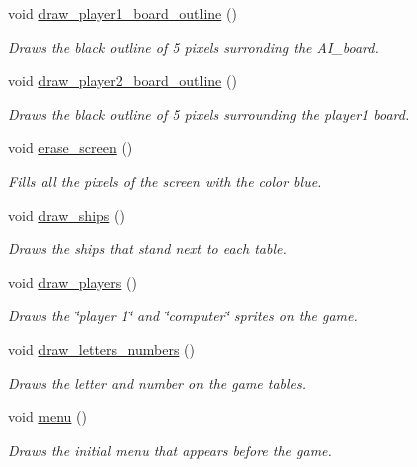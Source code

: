 \begin{DoxyCompactItemize}
void \hyperlink{group___commodore_ga5f0a49f9395c1235c3dc843a13c1f78d}{draw\-\_\-player1\-\_\-board\-\_\-outline} ()
\begin{DoxyCompactList}\small\item\em Draws the black outline of 5 pixels surronding the A\-I\-\_\-board. \end{DoxyCompactList}\item 
void \hyperlink{group___commodore_ga3466f1bb65e926fc83fca1e51c28b0e0}{draw\-\_\-player2\-\_\-board\-\_\-outline} ()
\begin{DoxyCompactList}\small\item\em Draws the black outline of 5 pixels surrounding the player1 board. \end{DoxyCompactList}\item 
void \hyperlink{group___commodore_ga9506fb14a5e597cecce754c1baeb64f8}{erase\-\_\-screen} ()
\begin{DoxyCompactList}\small\item\em Fills all the pixels of the screen with the color blue. \end{DoxyCompactList}\item 
void \hyperlink{group___commodore_ga631033297007a02f7b6c62218f584f64}{draw\-\_\-ships} ()
\begin{DoxyCompactList}\small\item\em Draws the ships that stand next to each table. \end{DoxyCompactList}\item 
void \hyperlink{group___commodore_gadd14788da31a0cc5eb8dc65ba1748f2b}{draw\-\_\-players} ()
\begin{DoxyCompactList}\small\item\em Draws the \char`\"{}player 1\char`\"{} and \char`\"{}computer\char`\"{} sprites on the game. \end{DoxyCompactList}\item 
void \hyperlink{group___commodore_ga59acfff76c01e88a1448d9d50a8a1461}{draw\-\_\-letters\-\_\-numbers} ()
\begin{DoxyCompactList}\small\item\em Draws the letter and number on the game tables. \end{DoxyCompactList}\item 
void \hyperlink{group___commodore_ga2a0e843767aeea4f433a28b9c54f573a}{menu} ()
\begin{DoxyCompactList}\small\item\em Draws the initial menu that appears before the game. \end{DoxyCompactList}\item 

\end{DoxyCompactItemize}
